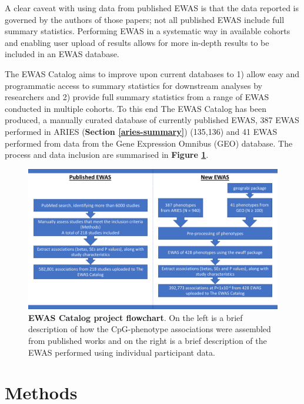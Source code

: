 \documentclass[11pt,oneside]{bristolthesis}
\begin{document}
A clear caveat with using data from published EWAS is that the data reported is governed by the authors of those papers; not all published EWAS include full summary statistics. Performing EWAS in a systematic way in available cohorts and enabling user upload of results allows for more in-depth results to be included in an EWAS database.

The EWAS Catalog aims to improve upon current databases to 1) allow easy and programmatic access to summary statistics for downstream analyses by researchers and 2) provide full summary statistics from a range of EWAS conducted in multiple cohorts. To this end The EWAS Catalog has been produced, a manually curated database of currently published EWAS, 387 EWAS performed in ARIES (\textbf{Section \ref{aries-summary}}) (135,136) and 41 EWAS performed from data from the Gene Expression Omnibus (GEO) database. The process and data inclusion are summarised in \textbf{Figure \ref{fig:catalog-project-workflow}}.




\begin{figure}

{\centering \includegraphics[width=1\linewidth]{figure/03-ewas_catalog/project_flowchart} 

}

\caption[EWAS Catalog project flowchart]{\textbf{EWAS Catalog project flowchart}. On the left is a brief description of how the CpG-phenotype associations were assembled from published works and on the right is a brief description of the EWAS performed using individual participant data.}\label{fig:catalog-project-workflow}
\end{figure}
\hypertarget{methods-03}{%
\section{Methods}\label{methods-03}}
\end{document}
